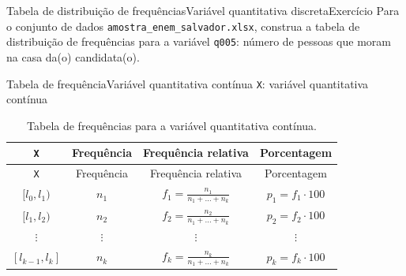 \documentclass[
  10pt,
  ignorenonframetext,
]{beamer}
\begin{document}
\begin{frame}[fragile]{Tabela de distribuição de
frequências\newline Variável quantitativa discreta\newline Exercício}
\protect\hypertarget{tabela-de-distribuiuxe7uxe3o-de-frequuxeanciasvariuxe1vel-quantitativa-discretaexercuxedcio}{}
Para o conjunto de dados \texttt{amostra\_enem\_salvador.xlsx}, construa
a tabela de distribuição de frequências para a variável \texttt{q005}:
número de pessoas que moram na casa da(o) candidata(o).
\end{frame}

\begin{frame}[fragile]{Tabela de frequência\newline Variável
quantitativa contínua}
\protect\hypertarget{tabela-de-frequuxeanciavariuxe1vel-quantitativa-contuxednua}{}
\texttt{X}: variável quantitativa contínua

\begin{longtable}[]{@{}cccc@{}}
\caption{Tabela de frequências para a variável quantitativa
contínua.}\tabularnewline
\toprule
\texttt{X} & Frequência & Frequência relativa &
Porcentagem\tabularnewline
\midrule
\endfirsthead
\toprule
\texttt{X} & Frequência & Frequência relativa &
Porcentagem\tabularnewline
\midrule
\endhead
\([l_0, l_1)\) & \(n_1\) & \(f_1 = \frac{n_1}{n_1 + \dots + n_k}\) &
\(p_1 = f_1 \cdot 100\)\tabularnewline
\([l_1, l_2)\) & \(n_2\) & \(f_2 = \frac{n_2}{n_1 + \dots + n_k}\) &
\(p_2 = f_2 \cdot 100\)\tabularnewline
\(\vdots\) & \(\vdots\) & \(\vdots\) & \(\vdots\)\tabularnewline
\([l_{k-1}, l_k]\) & \(n_k\) & \(f_k = \frac{n_k}{n_1 + \dots + n_k}\) &
\(p_k = f_k \cdot 100\)\tabularnewline
\bottomrule
\end{longtable}
\end{frame}
\end{document}
